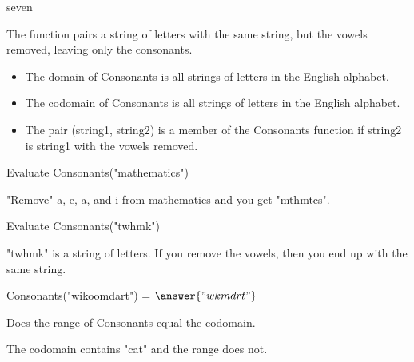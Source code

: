 \documentclass{ximera}
\begin{document}
seven

\begin{definition}
  The function  pairs a string of letters with the same string, but the vowels removed, leaving only the consonants.
 
    \begin{itemize}
    \item The domain of Consonants is all strings of letters in the English alphabet.
    \item The codomain of Consonants is all strings of letters in the English alphabet.
    \item The pair (string1, string2) is a member of the Consonants function if string2 is string1 with the vowels removed.
    \end{itemize}

  
\end{definition}



\begin{exercise}

 Evaluate Consonants("mathematics")

  \begin{multipleChoice}
  \end{multipleChoice}
  \begin{feedback}
"Remove" a, e, a, and i from mathematics and you get "mthmtcs".
  \end{feedback}
\end{exercise}



\begin{exercise}

 Evaluate Consonants("twhmk")

  \begin{multipleChoice}
  \end{multipleChoice}
  \begin{feedback}
"twhmk" is a string of letters. If you remove the vowels, then you end up with the same string.
  \end{feedback}
\end{exercise}


\begin{exercise}
Consonants("wikoomdart") = $\answer{"wkmdrt"}$
\end{exercise}


\begin{exercise}

Does the range of Consonants equal the codomain.

  \begin{multipleChoice}
  \end{multipleChoice}
  \begin{feedback}
The codomain contains "cat" and the range does not.
  \end{feedback}
\end{exercise}
\end{document}
